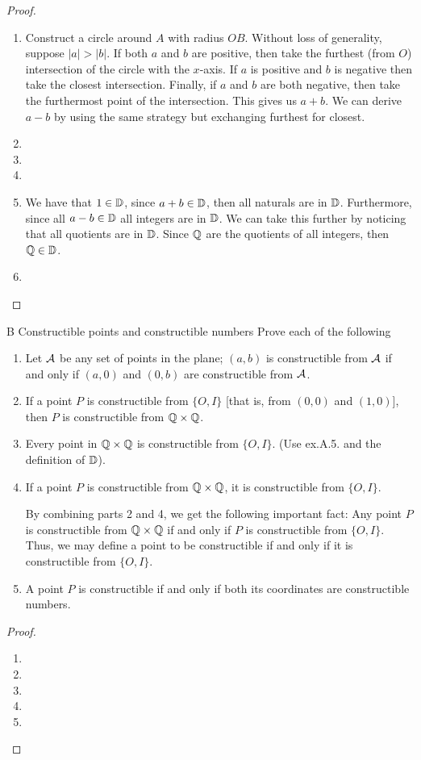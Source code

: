 \begin{proof}
 \begin{enumerate}
     \item Construct a circle around $A$ with radius $OB$. Without loss of generality, suppose $\lvert a\rvert>\lvert b\rvert$. If both $a$ and $b$ are positive, then take the furthest (from $O$) intersection of the circle with the $x$-axis. If $a$ is positive and $b$ is negative then take the closest intersection. Finally, if $a$ and $b$ are both negative, then take the furthermost point of the intersection. This gives us $a+b$. We can derive $a-b$ by using the same strategy but exchanging furthest for closest.
     \item
     \item
     \item 
     \item We have that $1\in\mathbb{D}$, since $a+b\in\mathbb{D}$, then all naturals are in $\mathbb{D}$. Furthermore, since all $a-b\in\mathbb{D}$ all integers are in $\mathbb{D}$. We can take this further by noticing that all quotients are in $\mathbb{D}$. Since $\mathbb{Q}$ are the quotients of all integers, then $\mathbb{Q}\in\mathbb{D}$. 
     \item
 \end{enumerate}
\end{proof}

\begin{exercise}{B Constructible points and constructible numbers}
Prove each of the following
\begin{enumerate}
    \item Let $\mathcal{A}$ be any set of points in the plane; $(a,b)$ is constructible from $\mathcal{A}$ if and only if $(a,0)$ and $(0,b)$ are constructible from  $\mathcal{A}$.
    \item If a point $P$ is constructible from $\{O,I\}$ [that is, from $(0,0)$ and $(1,0)$], then $P$ is constructible from $\mathbb{Q}\times\mathbb{Q}$.
    \item Every point in $\mathbb{Q}\times\mathbb{Q}$ is constructible from $\{O,I\}$. (Use ex.A.5. and the definition of $\mathbb{D}$).
    \item If a point $P$ is constructible from $\mathbb{Q}\times\mathbb{Q}$, it is constructible from $\{O,I\}$.

    By combining parts 2 and 4, we get the following important fact: Any point $P$ is constructible from $\mathbb{Q}\times\mathbb{Q}$ if and only if $P$ is constructible from $\{O,I\}$. Thus, we may define a point to be constructible if and only if it is constructible from $\{O,I\}$.
     \item A point $P$ is constructible if and only if both its coordinates are constructible numbers.
\end{enumerate}
\end{exercise}
\begin{proof}
 \begin{enumerate}
     \item 
     \item
     \item
     \item 
     \item
 \end{enumerate}
\end{proof}

